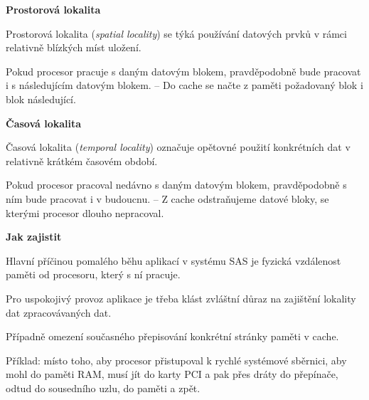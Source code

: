 \begin{compactitem}
    \item \textbf{Prostorová lokalita} \begin{compactitem}
        \item Prostorová lokalita (\textit{spatial locality}) se týká používání datových prvků v rámci relativně blízkých míst uložení.

        \item Pokud procesor pracuje s daným datovým blokem, pravděpodobně bude pracovat i s následujícím datovým blokem. -- Do cache se načte z paměti požadovaný blok i blok následující.
    \end{compactitem}

    \item \textbf{Časová lokalita} \begin{compactitem}
        \item Časová lokalita (\textit{temporal locality}) označuje opětovné použití konkrétních dat v relativně krátkém časovém období.

        \item Pokud procesor pracoval nedávno s daným datovým blokem, pravděpodobně s ním bude pracovat i v budoucnu. -- Z cache odstraňujeme datové bloky, se kterými procesor dlouho nepracoval.
    \end{compactitem}

    \item \textbf{Jak zajistit} \begin{compactitem}
        \item Hlavní příčinou pomalého běhu aplikací v systému SAS je fyzická vzdálenost paměti od procesoru, který s ní pracuje.

        \item Pro uspokojivý provoz aplikace je třeba klást zvláštní důraz na zajištění lokality dat zpracovávaných dat.

        \item Případně omezení současného přepisování konkrétní stránky paměti v cache.

        \item Příklad: místo toho, aby procesor přistupoval k rychlé systémové sběrnici, aby mohl do paměti RAM, musí jít do karty PCI a pak přes dráty do přepínače, odtud do sousedního uzlu, do paměti a zpět.
    \end{compactitem}
\end{compactitem}
